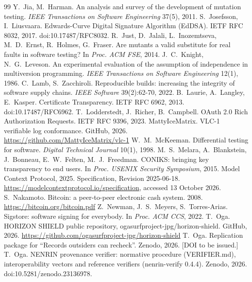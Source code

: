 \documentclass[preprint,12pt,authoryear]{elsarticle}
\begin{document}
\begin{thebibliography}{99}
 Y.~Jia, M.~Harman. An analysis and survey of the development of mutation testing. \emph{IEEE Transactions on Software Engineering} 37(5), 2011.
 S.~Josefsson, I.~Liusvaara. Edwards-Curve Digital Signature Algorithm (EdDSA). IETF RFC 8032, 2017. doi:10.17487/RFC8032.
 R.~Just, D.~Jalali, L.~Inozemtseva, M.~D.~Ernst, R.~Holmes, G.~Fraser. Are mutants a valid substitute for real faults in software testing? In \emph{Proc. ACM FSE}, 2014.
 J.~C.~Knight, N.~G.~Leveson. An experimental evaluation of the assumption of independence in multiversion programming. \emph{IEEE Transactions on Software Engineering} 12(1), 1986.
 C.~Lamb, S.~Zacchiroli. Reproducible builds: increasing the integrity of software supply chains. \emph{IEEE Software} 39(2):62-70, 2022.
 B.~Laurie, A.~Langley, E.~Kasper. Certificate Transparency. IETF RFC 6962, 2013. doi:10.17487/RFC6962.
 T.~Lodderstedt, J.~Richer, B.~Campbell. OAuth 2.0 Rich Authorization Requests. IETF RFC 9396, 2023.
 MattyIceMatrix. VLC-1 verifiable log conformance. GitHub, 2026. \url{https://github.com/MattyIceMatrix/vlc-1}
 W.~M.~McKeeman. Differential testing for software. \emph{Digital Technical Journal} 10(1), 1998.
 M.~S.~Melara, A.~Blankstein, J.~Bonneau, E.~W.~Felten, M.~J.~Freedman. CONIKS: bringing key transparency to end users. In \emph{Proc. USENIX Security Symposium}, 2015.
 Model Context Protocol, 2025. Specification, Revision 2025-06-18. \url{https://modelcontextprotocol.io/specification}, accessed 13 October 2026.
 S.~Nakamoto. Bitcoin: a peer-to-peer electronic cash system. 2008. \url{https://bitcoin.org/bitcoin.pdf}
 Z.~Newman, J.~S.~Meyers, S.~Torres-Arias. Sigstore: software signing for everybody. In \emph{Proc. ACM CCS}, 2022.
 T.~Oga. HORIZON SHIELD public repository, ogasurfproject-jpg/horizon-shield. GitHub, 2026. \url{https://github.com/ogasurfproject-jpg/horizon-shield}
 T.~Oga. Replication package for ``Records outsiders can recheck''. Zenodo, 2026. [DOI to be issued.]
 T.~Oga. NENRIN provenance verifier: normative procedure (VERIFIER.md), interoperability vectors and reference verifiers (nenrin-verify 0.4.4). Zenodo, 2026. doi:10.5281/zenodo.23136978.

\end{thebibliography}
\end{document}
